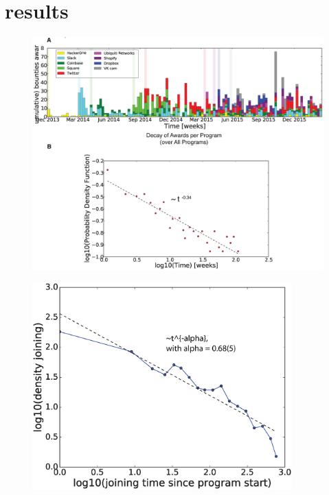 \section{results}

\begin{figure}
\begin{center}
\includegraphics[width=16cm]{figures/timeline.eps}
\caption{ }
\label{ }
\end{center}
\end{figure}


\begin{figure}
\begin{center}
\includegraphics[width=10cm]{figures/density_joining.eps}
\caption{ }
\label{ }
\end{center}
\end{figure}



